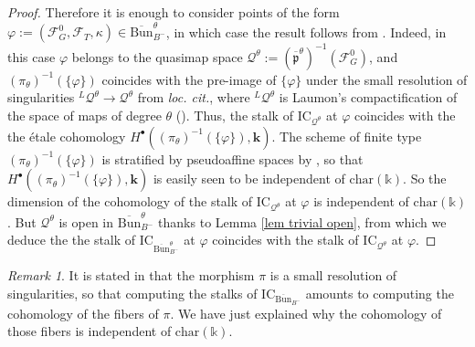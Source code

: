 \documentclass[11pt]{amsart}
\theoremstyle{plain}
\theoremstyle{remark}
\newtheorem{rem}[thm]{Remark}
\numberwithin{equation}{section}
\begin{document}
\begin{proof}
		Therefore it is enough to consider points of the form $\varphi:=(\mathcal{F}^0_G,\mathcal{F}_T,\kappa)\in \overline{\mathrm{Bun}}_{B^-}^\theta$, in which case the result follows from  \cite{kuznetsov1996laumon}. Indeed, in this case $\varphi$ belongs to the quasimap space $\mathcal{Q}^\theta:=(\overline{\mathfrak{p}}^\theta)^{-1}(\mathcal{F}^0_G)$, and $(\pi_\theta)^{-1}(\{\varphi\})$ coincides with the pre-image of $\{\varphi\}$ under the small resolution of singularities $^L\mathcal{Q}^\theta\to \mathcal{Q}^\theta$ from \textit{loc. cit.}, where $^L\mathcal{Q}^\theta$ is Laumon's compactification of the space of maps of degree $\theta$ (\cite[§1.4]{kuznetsov1996laumon}). Thus, the stalk of $\mathrm{IC}_{\mathcal{Q}^\theta}$ at $\varphi$ coincides with the the \'etale cohomology $H^\bullet((\pi_\theta)^{-1}(\{\varphi\}),\mathbf{k})$. The scheme of finite type $(\pi_\theta)^{-1}(\{\varphi\})$ is stratified by pseudoaffine spaces by \cite[Corollary 2.4.4]{kuznetsov1996laumon}, so that $H^\bullet((\pi_\theta)^{-1}(\{\varphi\}),\mathbf{k})$ is easily seen to be independent of $\mathrm{char}(\mathbb{k})$. So the dimension of the cohomology of the stalk of $\mathrm{IC}_{\mathcal{Q}^\theta}$ at $\varphi$ is independent of $\mathrm{char}(\mathbb{k})$. But $\mathcal{Q}^\theta$ is open in $\overline{\mathrm{Bun}}_{B^-}^\theta$ thanks to Lemma \ref{lem trivial open}, from which we deduce the the stalk of $\mathrm{IC}_{\overline{\mathrm{Bun}}_{B^-}^\theta}$ at $\varphi$ coincides with the stalk of $\mathrm{IC}_{\mathcal{Q}^\theta}$ at $\varphi$.
	\end{proof}
	\begin{rem}
		It is stated in \cite[§0.2.1]{BG} that the morphism $\pi$ is a small resolution of singularities, so that computing the stalks of $\mathrm{IC}_{\overline{\mathrm{Bun}}_{B^-}}$ amounts to computing the cohomology of the fibers of $\pi$. We have just explained why the cohomology of those fibers is independent of $\mathrm{char}(\mathbb{k})$. 
	\end{rem}
\end{document}
